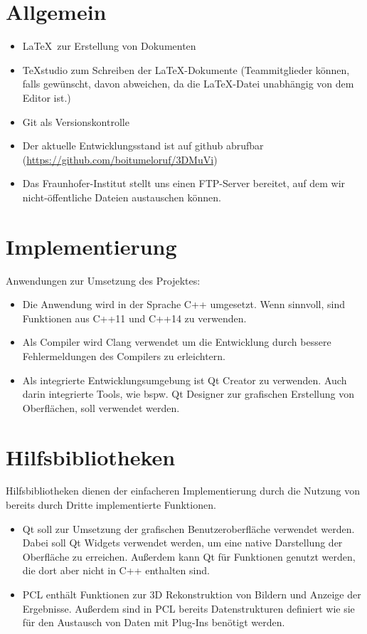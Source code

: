 
\section{Allgemein}
	\begin{itemize}
		\item \LaTeX\ zur Erstellung von Dokumenten
		\item TeXstudio zum Schreiben der \LaTeX-Dokumente (Teammitglieder können, falls gewünscht, davon abweichen, da die \LaTeX-Datei unabhängig von dem Editor ist.)
		\item Git als Versionskontrolle
		\item Der aktuelle Entwicklungsstand ist auf github abrufbar
		\newline(\href{https://github.com/boitumeloruf/3DMuVi}{https://github.com/boitumeloruf/3DMuVi})
		\item Das Fraunhofer-Institut stellt uns einen FTP-Server bereitet, auf dem wir nicht-öffentliche Dateien austauschen können.
	\end{itemize}
\section{Implementierung}
	Anwendungen zur Umsetzung des Projektes:
	\begin{itemize}
		\item Die Anwendung wird in der Sprache C++ umgesetzt. Wenn sinnvoll, sind Funktionen aus C++11 und C++14 zu verwenden.
		\item Als Compiler wird Clang verwendet um die Entwicklung durch bessere Fehlermeldungen des Compilers zu erleichtern.
		\item Als integrierte Entwicklungsumgebung ist Qt Creator zu verwenden. Auch darin integrierte Tools, wie bspw. Qt Designer zur grafischen Erstellung von Oberflächen, soll verwendet werden.
	\end{itemize}
\section{Hilfsbibliotheken}
	Hilfsbibliotheken dienen der einfacheren Implementierung durch die Nutzung von bereits durch Dritte implementierte Funktionen.
	\begin{itemize}
		\item Qt soll zur Umsetzung der grafischen Benutzeroberfläche verwendet werden. Dabei soll Qt Widgets verwendet werden, um eine native Darstellung der Oberfläche zu erreichen. Außerdem kann Qt für Funktionen genutzt werden, die dort aber nicht in C++ enthalten sind.
		\item PCL enthält Funktionen zur 3D Rekonstruktion von Bildern und Anzeige der Ergebnisse. Außerdem sind in PCL bereits Datenstrukturen definiert wie sie für den Austausch von Daten mit Plug-Ins benötigt werden.
	\end{itemize}
